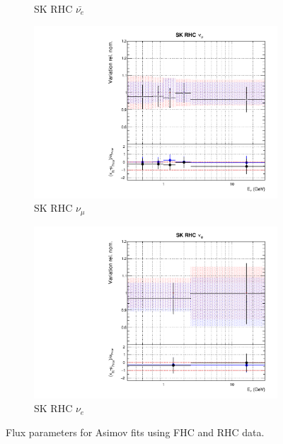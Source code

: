 \begin{figure}[t]
\begin{subfigure}{0.24\textwidth}
  \caption{SK RHC $\bar{\nu_e}$}
\end{subfigure}
\begin{subfigure}{0.24\textwidth}
  \centering
  \includegraphics[width=0.95\linewidth]{figs/rhcmpasmvflux14}
  \caption{SK RHC $\nu_{\mu}$}
\end{subfigure}
\begin{subfigure}{0.24\textwidth}
  \centering
  \includegraphics[width=0.95\linewidth]{figs/rhcmpasmvflux15}
  \caption{SK RHC $\nu_e$}
\end{subfigure}
\caption{Flux parameters for Asimov fits using FHC and RHC data.}
\label{fig:rhcmpiasmvSK}
\end{figure}

